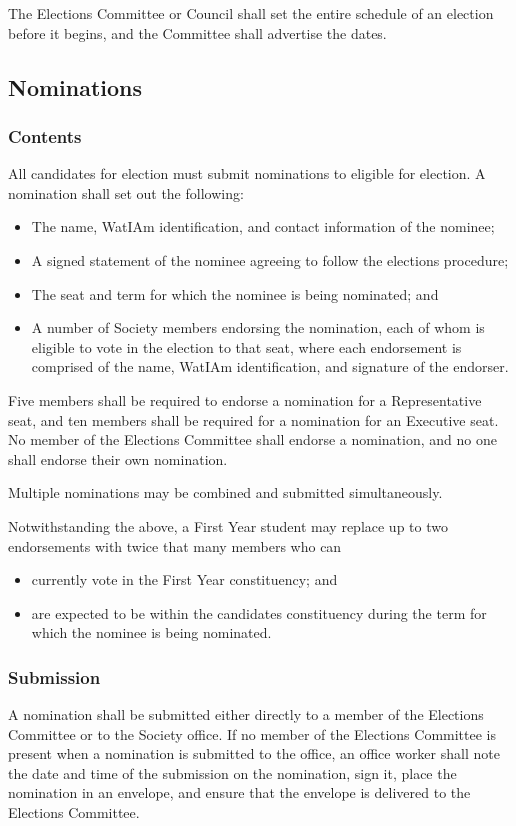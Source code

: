 The Elections Committee or Council shall set the entire schedule of an election
before it begins, and the Committee shall advertise the dates.

\subsection{Nominations}
\subsubsection{Contents}
All candidates for election must submit nominations to eligible for election.
A nomination shall set out the following:
\begin{itemize}
\item The name, WatIAm identification, and contact information of the nominee;
\item A signed statement of the nominee agreeing to follow the elections
procedure;
\item The seat and term for which the nominee is being nominated; and
\item A number of Society members endorsing the nomination, each of whom is eligible 
to vote in the election to that seat, where each endorsement is comprised of the name, 
WatIAm identification, and signature of the endorser.
\end{itemize}


Five members shall be required to endorse a nomination for a Representative
seat, and ten members shall be required for a nomination for an Executive seat. 
No member of the Elections Committee shall endorse a nomination, and no one shall 
endorse their own nomination.

Multiple nominations may be combined and submitted simultaneously.

Notwithstanding the above, a First Year student may replace up to two
endorsements with twice that many members who can 
\begin{itemize}
	\item currently vote in the First Year constituency; and 
	\item are expected to be within the candidates constituency during the term for which the nominee is being nominated.
\end{itemize}

\subsubsection{Submission}
A nomination shall be submitted either directly to a member of the Elections
Committee or to the Society office. If no member of the Elections Committee is
present when a nomination is submitted to the office, an office worker shall
note the date and time of the submission on the nomination, sign it, place the
nomination in an envelope, and ensure that the envelope is delivered to the
Elections Committee.

